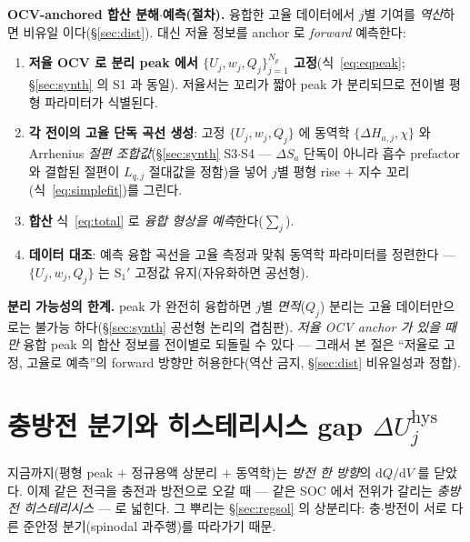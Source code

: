 \documentclass[11pt,a4paper]{article}
\newcommand{\dd}{\mathrm{d}}
\newcommand{\hys}{\mathrm{hys}}
\begin{document}
\textbf{OCV-anchored 합산 분해$\cdot$예측(절차).} 융합한 고율 데이터에서 $j$별 기여를 \emph{역산}하면 비유일
이다(\S\ref{sec:dist}). 대신 저율 정보를 anchor 로 \emph{forward} 예측한다:
\begin{enumerate}[label=\textbf{S$_\arabic*'$.},leftmargin=2.8em,itemsep=2pt]
\item \textbf{저율 OCV 로 분리 peak 에서 $\{U_j,w_j,Q_j\}_{j=1}^{N_p}$ 고정}(식~\eqref{eq:eqpeak}; \S\ref{sec:synth}
  의 S1 과 동일). 저율서는 꼬리가 짧아 peak 가 분리되므로 전이별 평형 파라미터가 식별된다.
\item \textbf{각 전이의 고율 단독 곡선 생성}: 고정 $\{U_j,w_j,Q_j\}$ 에 동역학 $\{\Delta H_{a,j},\chi\}$ 와 Arrhenius
  \emph{절편 조합값}(\S\ref{sec:synth} S3$\cdot$S4 — $\Delta S_a$ 단독이 아니라 흡수 prefactor 와 결합된 절편이
  $L_{q,j}$ 절대값을 정함)을 넣어 $j$별 평형 rise $+$ 지수 꼬리(식~\eqref{eq:simplefit})를 그린다.
\item \textbf{합산} 식~\eqref{eq:total} 로 \emph{융합 형상을 예측}한다($\sum_j$).
\item \textbf{데이터 대조}: 예측 융합 곡선을 고율 측정과 맞춰 동역학 파라미터를 정련한다 — $\{U_j,w_j,Q_j\}$ 는
  S$_1'$ 고정값 유지(자유화하면 공선형).
\end{enumerate}
\textbf{분리 가능성의 한계.} peak 가 완전히 융합하면 $j$별 \emph{면적}($Q_j$) 분리는 고율 데이터만으로는 불가능
하다(\S\ref{sec:synth} 공선형 논리의 겹침판). \emph{저율 OCV anchor 가 있을 때만} 융합 peak 의 합산 정보를
전이별로 되돌릴 수 있다 — 그래서 본 절은 ``저율로 고정, 고율로 예측''의 forward 방향만 허용한다(역산 금지,
\S\ref{sec:dist} 비유일성과 정합).

\section{충방전 분기와 히스테리시스 gap $\Delta U_j^\hys$}\label{sec:hys_branch}
지금까지(평형 peak $+$ 정규용액 상분리 $+$ 동역학)는 \emph{방전 한 방향}의 $\dd Q/\dd V$ 를 닫았다. 이제 같은
전극을 충전과 방전으로 오갈 때 — 같은 SOC 에서 전위가 갈리는 \emph{충방전 히스테리시스} — 로 넓힌다. 그 뿌리는
\S\ref{sec:regsol} 의 상분리다: 충$\cdot$방전이 서로 다른 준안정 분기(spinodal 과주행)를 따라가기 때문.
\end{document}
